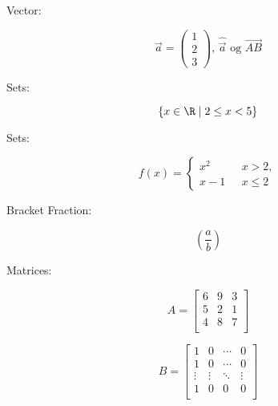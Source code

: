 \documentclass[a4paper,12pt,oneside,article]{memoir}
\begin{document}
\begin{flushleft}
\vspace{.1cm}

Vector:

\begin{equation*}
	\vec{a} =\begin{pmatrix} 1\\2\\3 \end{pmatrix} \text{, } \widehat{\vec{a}} \text{ og } \overrightarrow{AB}
\end{equation*}


\vspace{.1cm}

Sets:


\begin{equation*}
	\{x \in \R \mid 2\leq x<5\} 
\end{equation*}


\vspace{.1cm}

Sets:

\begin{equation*}
	f(x) = \begin{cases}
	x^2 & \text{ } x>2,\\
	x-1 & \text{ } x\leq 2
	\end{cases}
\end{equation*}


\vspace{.1cm}

Bracket Fraction:

\begin{equation*}
	\left(\frac{a}{b} \right)
\end{equation*}

\vspace{.1cm}

Matrices: 
 
\[A=
\begin{bmatrix}
6&9&3\\
5&2&1\\
4&8&7\\

\end{bmatrix}
\]

\[B=
\begin{bmatrix}
1&0&\cdots&0\\
1&0&\cdots&0\\
\vdots & \vdots &\ddots &\vdots\\
1&0&0&0 \\
\end{bmatrix}
\]


\end{flushleft}
\end{document}
